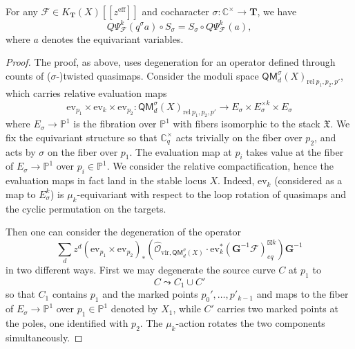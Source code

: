 \documentclass[10pt,a4paper]{amsart}
\newcommand{\curly}{\mathrel{\leadsto}}
\begin{document}
\begin{thm}
    For any $\mathcal{F} \in K_{\mathbf{T}}(X)[\![ z^{\mathrm{eff}} ]\!]$ and cocharacter $\sigma: \mathbb{C}^{\times} \to \mathbf{T}$, we have
    \begin{equation}
        Q\Psi^k_{\mathcal{F}}(q^{\sigma} a) \circ S_{\sigma} = S_{\sigma} \circ Q\Psi^k_{\mathcal{F}}(a),
    \end{equation}
    where $a$ denotes the equivariant variables.
\end{thm}

\begin{proof}
    The proof, as above, uses degeneration for an operator defined through counts of ($\sigma$-)twisted quasimaps. Consider the moduli space $\mathsf{QM}_d^{\sigma}(X)_{\mathrm{rel} \ p_1, p_2, p'}$, which carries relative evaluation maps
    \begin{equation}
        \mathrm{ev}_{p_1} \times \mathrm{ev}_k \times \mathrm{ev}_{p_2} : \mathsf{QM}_d^{\sigma}(X)_{\mathrm{rel} \ p_1, p_2, p'} \to E_\sigma \times E_\sigma^{\times k} \times E_\sigma
    \end{equation}
    where $E_\sigma \to \mathbb{P}^1$ is the fibration over $\mathbb{P}^1$ with fibers isomorphic to the stack $\mathfrak{X}$. We fix the equivariant structure so that $\mathbb{C}^\times_q$ acts trivially on the fiber over $p_2$, and acts by $\sigma$ on the fiber over $p_1$. The evaluation map at $p_i$ takes value at the fiber of $E_\sigma \to \mathbb{P}^1$ over $p_i \in \mathbb{P}^1$. We consider the relative compactification, hence the evaluation maps in fact land in the stable locus $X$.  Indeed, $\mathrm{ev}_k$ (considered as a map to $E_\sigma^k$) is $\mu_k$-equivariant with respect to the loop rotation of quasimaps and the cyclic permutation on the targets.
    
    Then one can consider the degeneration of the operator
    \begin{equation}
        \sum_ d z^d (\mathrm{ev}_{p_1} \times \mathrm{ev}_{p_2} )_*  \left(  \hat{\mathcal{O}}_{\mathrm{vir} ,\mathsf{QM}_d^{\sigma} (X)} \cdot   \mathrm{ev}_k^* (\mathbf{G}^{-1}\mathcal{F})_{eq}^{\boxtimes k} \right) \mathbf{G}^{-1}
    \end{equation}
    in two different ways. First we may degenerate the source curve $C$ at $p_1$ to  \begin{equation}
        C \curly C_1 \cup C'
    \end{equation}
    so that $C_1$ contains $p_1$ and the marked points $p_0', \dots, p'_{k-1}$ and maps to the fiber of $E_\sigma \to \mathbb{P}^1$ over $p_1 \in \mathbb{P}^1$ denoted by $X_1$, while $C'$ carries two marked points at the poles, one identified with $p_2$. The $\mu_k$-action rotates the two components simultaneously.


\end{proof}
\end{document}
